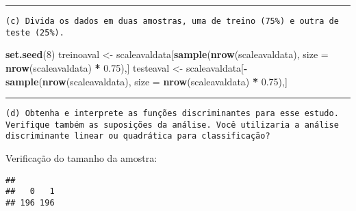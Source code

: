 \documentclass[]{article}
\newenvironment{Shaded}{\begin{snugshade}}{\end{snugshade}}
\newcommand{\KeywordTok}[1]{\textcolor[rgb]{0.13,0.29,0.53}{\textbf{#1}}}
\newcommand{\DataTypeTok}[1]{\textcolor[rgb]{0.13,0.29,0.53}{#1}}
\newcommand{\DecValTok}[1]{\textcolor[rgb]{0.00,0.00,0.81}{#1}}
\newcommand{\FloatTok}[1]{\textcolor[rgb]{0.00,0.00,0.81}{#1}}
\newcommand{\StringTok}[1]{\textcolor[rgb]{0.31,0.60,0.02}{#1}}
\newcommand{\OperatorTok}[1]{\textcolor[rgb]{0.81,0.36,0.00}{\textbf{#1}}}
\newcommand{\NormalTok}[1]{#1}
\begin{document}
\begin{center}\rule{0.5\linewidth}{\linethickness}\end{center}

\begin{verbatim}
(c) Divida os dados em duas amostras, uma de treino (75%) e outra de teste (25%).
\end{verbatim}

\begin{Shaded}
\begin{Highlighting}[]
\KeywordTok{set.seed}\NormalTok{(}\DecValTok{8}\NormalTok{)}
\NormalTok{treinoaval <-}\StringTok{ }\NormalTok{scaleavaldata[}\KeywordTok{sample}\NormalTok{(}\KeywordTok{nrow}\NormalTok{(scaleavaldata),  }\DataTypeTok{size =} \KeywordTok{nrow}\NormalTok{(scaleavaldata) }\OperatorTok{*}\StringTok{ }\FloatTok{0.75}\NormalTok{),]}
\NormalTok{testeaval <-}\StringTok{ }\NormalTok{scaleavaldata[}\OperatorTok{-}\KeywordTok{sample}\NormalTok{(}\KeywordTok{nrow}\NormalTok{(scaleavaldata),  }\DataTypeTok{size =} \KeywordTok{nrow}\NormalTok{(scaleavaldata) }\OperatorTok{*}\StringTok{ }\FloatTok{0.75}\NormalTok{),]}
\end{Highlighting}
\end{Shaded}

\begin{center}\rule{0.5\linewidth}{\linethickness}\end{center}

\begin{verbatim}
(d) Obtenha e interprete as funções discriminantes para esse estudo. Verifique também as suposições da análise. Você utilizaria a análise discriminante linear ou quadrática para classificação?
\end{verbatim}

Verificação do tamanho da amostra:

\begin{Shaded}
\end{Shaded}

\begin{verbatim}
## 
##   0   1 
## 196 196
\end{verbatim}

\begin{Shaded}
\end{Shaded}
\end{document}
